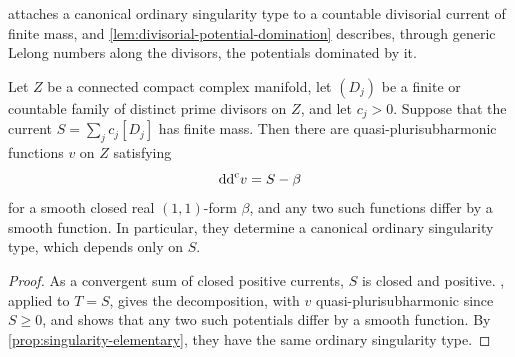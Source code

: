  attaches a canonical ordinary singularity type to a countable divisorial current of finite mass, and \cref{lem:divisorial-potential-domination} describes, through generic Lelong numbers along the divisors, the potentials dominated by it.
\begin{corollary}\label{cor:divisorial-current-ordinary-type}
Let $Z$ be a connected compact complex manifold, let $(D_j)$ be a finite or countable family of distinct prime divisors on $Z$, and let $c_j>0$. Suppose that the current $S=\sum_jc_j[D_j]$ has finite mass. Then there are quasi-plurisubharmonic functions $v$ on $Z$ satisfying
\[
 \mathrm{dd}^{\mathrm{c}} v=S-\beta
\]
for a smooth closed real $(1,1)$-form $\beta$, and any two such functions differ by a smooth function. In particular, they determine a canonical ordinary singularity type, which depends only on $S$.
\end{corollary}
\begin{proof}
As a convergent sum of closed positive currents, $S$ is closed and positive. , applied to $T=S$, gives the decomposition, with $v$ quasi-plurisubharmonic since $S\geq0$, and shows that any two such potentials differ by a smooth function. By \cref{prop:singularity-elementary}, they have the same ordinary singularity type.
\end{proof}
